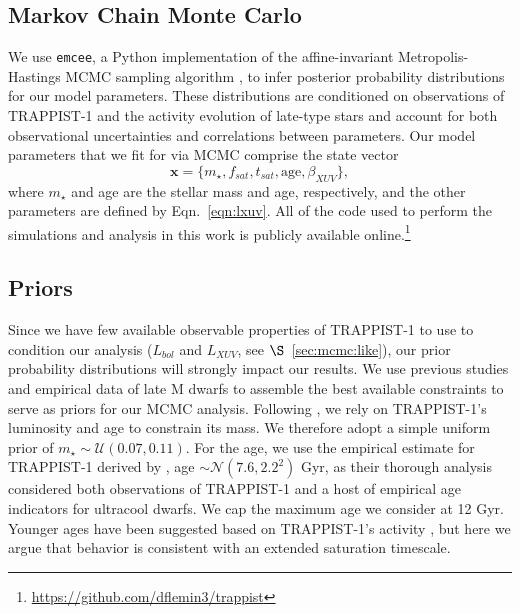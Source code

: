 \documentclass[twocolumn]{aastex62}
\def\gsim{~\rlap{$>$}{\lower 1.0ex\hbox{$\sim$}}}
\begin{document}
\subsection{Markov Chain Monte Carlo} \label{sec:mcmc}

We use \texttt{emcee}, a Python implementation of the affine-invariant Metropolis-Hastings MCMC sampling algorithm \citep{ForemanMackey2013}, to infer posterior probability distributions for our model parameters. These distributions are conditioned on observations of TRAPPIST-1 and the activity evolution of late-type stars and account for both observational uncertainties and correlations between parameters. Our model parameters that we fit for via MCMC comprise the state vector
\begin{equation} \label{eqn:state}
    \textbf{x} = \{m_{\star}, f_{sat}, t_{sat}, \mathrm{age}, \beta_{XUV}\},
\end{equation}
where $m_{\star}$ and age are the stellar mass and age, respectively, and the other parameters are defined by Eqn.~\ref{eqn:lxuv}. All of the code used to perform the simulations and analysis in this work is publicly available online.\footnote{ \href{https://github.com/dflemin3/trappist}{https://github.com/dflemin3/trappist}}

\subsection{Priors} \label{sec:mcmc:priors}

Since we have few available observable properties of TRAPPIST-1 to use to condition our analysis ($L_{bol}$ and $L_{XUV}$, see $\S$~\ref{sec:mcmc:like}), our prior probability distributions will strongly impact our results. We use previous studies and empirical data of late M dwarfs to assemble the best available constraints to serve as priors for our MCMC analysis. Following \citet{vanGrootel2018}, we rely on TRAPPIST-1's luminosity and age to constrain its mass. We therefore adopt a simple uniform prior of $m_{\star} \sim \mathcal{U}(0.07, 0.11)$. For the age, we use the empirical estimate for TRAPPIST-1 derived by \citet{Burgasser2017}, age $\sim \mathcal{N}(7.6, 2.2^2)$ Gyr, as their thorough analysis considered both observations of TRAPPIST-1 and a host of empirical age indicators for ultracool dwarfs. We cap the maximum age we consider at 12 Gyr. Younger ages have been suggested based on TRAPPIST-1's activity \citep[e.g.~$\gsim 500$ Myr,][]{Bourrier2017b}, but here we argue that behavior is consistent with an extended saturation timescale.
\end{document}
